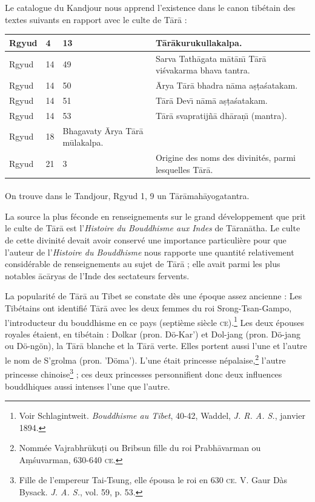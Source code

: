 \documentclass[a4paper, 11pt, oneside, french]{article}
\begin{document}
Le catalogue du Kandjour nous apprend l'existence dans le canon tibétain des textes suivants en rapport avec le culte de T\={a}r\={a} :
\begin{table}[H]
    \centering
    \bfseries
    \tiny
    \begin{tabular}{|l|l|p{12mm}|p{30mm}|}
    \hline
        Rgyud & 4 & 13 & T\={a}r\={a}kurukullakalpa. \\ \hline
        Rgyud & 14 & 49 & Sarva Tath\={a}gata m\={a}t\={a}n\={\i} T\={a}r\={a} vi\'{s}vakarma bhava tantra. \\ \hline
        Rgyud & 14 & 50 & \={A}rya T\={a}r\={a} bhadra n\={a}ma a\d{s}\d{t}a\'{s}atakam. \\ \hline 
        Rgyud & 14 & 51 & T\={a}r\={a} Dev\={\i} n\={a}m\={a} a\d{s}\d{t}a\'{s}atakam. \\ \hline
        Rgyud & 14 & 53 & T\={a}r\={a} svapratij\~{n}\={a} dh\={a}ra\d{n}\={\i} (mantra). \\ \hline 
        Rgyud & 18 & Bhagavaty \={A}rya T\={a}r\={a} m\={u}lakalpa. & ~ \\ \hline
        Rgyud & 21 & 3 & Origine des noms des divinités, parmi lesquelles T\={a}r\={a}. \\ \hline
    \end{tabular}
\end{table}
\paragraph{}
On trouve dans le Tandjour, Rgyud 1, 9 un T\={a}r\={a}mah\={a}yogatantra.

La source la plus féconde en renseignements sur le grand développement que prit le culte de T\={a}r\={a} est l'\emph{Histoire du Bouddhisme aux Indes} de T\={a}ran\={a}tha. Le culte de cette divinité devait avoir conservé une importance particulière pour que l'auteur de l'\emph{Histoire du Bouddhisme} nous rapporte une quantité relativement considérable de renseignements au sujet de T\={a}r\={a} ; elle avait parmi les plus notables \={a}c\={a}ryas de l'Inde des sectateurs fervents.

La popularité de T\={a}r\={a} au Tibet se constate dès une époque assez ancienne : Les Tibétains ont identifié T\={a}r\={a} avec les deux femmes du roi Srong-Tsan-Gampo, l'introducteur du bouddhisme en ce pays (septième siècle \textsc{ce}).\footnote{Voir Schlagintweit. \emph{Bouddhisme au Tibet}, 40-42, Waddel, \emph{J. R. A. S.}, janvier 1894.} Les deux épouses royales étaient, en tibétain : Dolkar (pron. Dö-Kar') et Dol-jang (pron. Dö-jang ou Dö-ngön), la T\={a}r\={a} blanche et la T\={a}r\={a} verte. Elles portent aussi l'une et l'autre le nom de S'grolma (pron. 'Döma'). L'une était princesse népalaise,\footnote{Nommée Vajrabhr\={u}ku\d{t}i ou Bribsun fille du roi Prabh\={a}varman ou A\d{m}\'{s}uvarman, 630-640 \textsc{ce}.} l'autre princesse chinoise\footnote{Fille de l'empereur Tai-Tsung, elle épousa le roi en 630 \textsc{ce}. V. Gaur Dàs Bysack. \emph{J. A. S.}, vol. 59, p. 53.} ; ces deux princesses personnifient donc deux influences bouddhiques aussi intenses l'une que l'autre.
\end{document}
